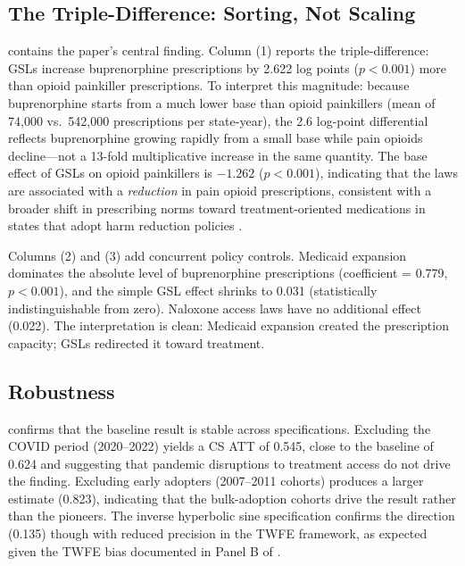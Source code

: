 \documentclass[12pt]{article}
\begin{document}
\subsection{The Triple-Difference: Sorting, Not Scaling}



 contains the paper's central finding. Column (1) reports the triple-difference: GSLs increase buprenorphine prescriptions by 2.622 log points ($p < 0.001$) more than opioid painkiller prescriptions. To interpret this magnitude: because buprenorphine starts from a much lower base than opioid painkillers (mean of 74,000 vs.\ 542,000 prescriptions per state-year), the 2.6 log-point differential reflects buprenorphine growing rapidly from a small base while pain opioids decline---not a 13-fold multiplicative increase in the same quantity. The base effect of GSLs on opioid painkillers is $-1.262$ ($p < 0.001$), indicating that the laws are associated with a \textit{reduction} in pain opioid prescriptions, consistent with a broader shift in prescribing norms toward treatment-oriented medications in states that adopt harm reduction policies \citep{buchmueller2015, dave2019}.

Columns (2) and (3) add concurrent policy controls. Medicaid expansion dominates the absolute level of buprenorphine prescriptions (coefficient = 0.779, $p < 0.001$), and the simple GSL effect shrinks to 0.031 (statistically indistinguishable from zero). Naloxone access laws have no additional effect (0.022). The interpretation is clean: Medicaid expansion created the prescription capacity; GSLs redirected it toward treatment.

\subsection{Robustness}



 confirms that the baseline result is stable across specifications. Excluding the COVID period (2020--2022) yields a CS ATT of 0.545, close to the baseline of 0.624 and suggesting that pandemic disruptions to treatment access do not drive the finding. Excluding early adopters (2007--2011 cohorts) produces a larger estimate (0.823), indicating that the bulk-adoption cohorts drive the result rather than the pioneers. The inverse hyperbolic sine specification confirms the direction (0.135) though with reduced precision in the TWFE framework, as expected given the TWFE bias documented in Panel B of .
\end{document}
